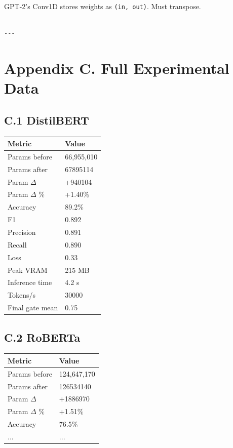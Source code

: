 GPT-2's Conv1D stores weights as \texttt{(in, out)}. Must transpose.
\begin{lstlisting}

---
\end{lstlisting}


\section{Appendix C. Full Experimental Data}

\subsection{C.1 DistilBERT}

\begin{table}[H]
\centering
\small
\begin{tabular}{ll}
\toprule
\textbf{Metric} & \textbf{Value} \\
\midrule
Params before & 66,955,010 \\
Params after & 67895114 \\
Param $\Delta$ & +940104 \\
Param $\Delta$ \% & +1.40\% \\
Accuracy & 89.2\% \\
F1 & 0.892 \\
Precision & 0.891 \\
Recall & 0.890 \\
Loss & 0.33 \\
Peak VRAM & 215 MB \\
Inference time & 4.2 s \\
Tokens/s & 30000 \\
Final gate mean & 0.75 \\
\bottomrule
\end{tabular}
\end{table}

\subsection{C.2 RoBERTa}

\begin{table}[H]
\centering
\small
\begin{tabular}{ll}
\toprule
\textbf{Metric} & \textbf{Value} \\
\midrule
Params before & 124,647,170 \\
Params after & 126534140 \\
Param $\Delta$ & +1886970 \\
Param $\Delta$ \% & +1.51\% \\
Accuracy & 76.5\% \\
... & ... \\
\bottomrule
\end{tabular}
\end{table}

